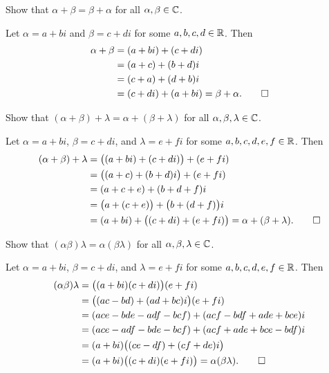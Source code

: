 \begin{exc}

\begin{exercise}
Show that $\alpha+\beta=\beta+\alpha$ for all $\alpha,\beta\in\mathbb{C}$.
\end{exercise}
\begin{solution}
Let $\alpha=a+bi$ and $\beta=c+di$ for some $a,b,c,d\in\mathbb{R}$. Then
\begin{align*}
\alpha+\beta &= (a+bi)+(c+di)\\
             &= (a+c)+(b+d)i\\
             &= (c+a)+(d+b)i\\
             &= (c+di)+(a+bi) = \beta+\alpha. \qedhere
\end{align*}
\end{solution}

\begin{exercise}
Show that $(\alpha+\beta)+\lambda=\alpha+(\beta+\lambda)$ for all
$\alpha,\beta,\lambda\in\mathbb{C}$.
\end{exercise}
\begin{solution}
Let $\alpha=a+bi$, $\beta=c+di$, and $\lambda=e+fi$ for some
$a,b,c,d,e,f\in\mathbb{R}$. Then
\begin{align*}
(\alpha+\beta)+\lambda &= \bigl((a+bi)+(c+di)\bigr)+(e+fi)\\
  &= \bigl((a+c)+(b+d)i\bigr)+(e+fi)\\
  &= (a+c+e)+(b+d+f)i\\
  &= \bigl(a+(c+e)\bigr)+\bigl(b+(d+f)\bigr)i\\
  &= (a+bi)+\bigl((c+di)+(e+fi)\bigr) = \alpha+(\beta+\lambda). \qedhere
\end{align*}
\end{solution}

\begin{exercise}
Show that $(\alpha\beta)\lambda=\alpha(\beta\lambda)$ for all
$\alpha,\beta,\lambda\in\mathbb{C}$.
\end{exercise}
\begin{solution}
Let $\alpha=a+bi$, $\beta=c+di$, and $\lambda=e+fi$ for some
$a,b,c,d,e,f\in\mathbb{R}$. Then
\begin{align*}
(\alpha\beta)\lambda &= \bigl((a+bi)(c+di)\bigr)(e+fi)\\
  &= \bigl((ac-bd)+(ad+bc)i\bigr)(e+fi)\\
  &= (ace-bde-adf-bcf)+(acf-bdf+ade+bce)i\\
  &= (ace-adf-bde-bcf)+(acf+ade+bce-bdf)i\\
  &= (a+bi)\bigl((ce-df)+(cf+de)i\bigr)\\
  &= (a+bi)\bigl((c+di)(e+fi)\bigr) = \alpha(\beta\lambda). \qedhere
\end{align*}
\end{solution}


\end{exc}
